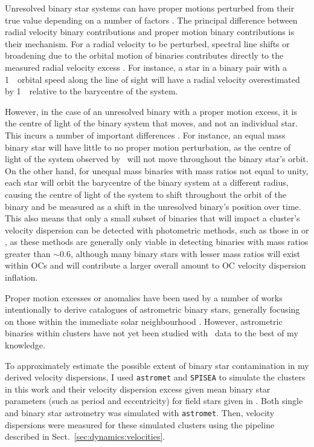 Unresolved binary star systems can have proper motions perturbed from their true value depending on a number of factors \citep{penoyre_binary_2020}. The principal difference between radial velocity binary contributions and proper motion binary contributions is their mechanism. For a radial velocity to be perturbed, spectral line shifts or broadening due to the orbital motion of binaries contributes directly to the measured radial velocity excess \citep{gieles_velocity_2010}. For instance, a star in a binary pair with a 1~\kms\ orbital speed along the line of sight will have a radial velocity overestimated by 1~\kms\ relative to the barycentre of the system.

However, in the case of an unresolved binary with a proper motion excess, it is the centre of light of the binary system that moves, and not an individual star. This incurs a number of important differences \citep{penoyre_binary_2020}. For instance, an equal mass binary star will have little to no proper motion perturbation, as the centre of light of the system observed by \gaia\ will not move throughout the binary star's orbit. On the other hand, for unequal mass binaries with mass ratios not equal to unity, each star will orbit the barycentre of the binary system at a different radius, causing the centre of light of the system to shift throughout the orbit of the binary and be measured as a shift in the unresolved binary's position over time. This also means that only a small subset of binaries that will impact a cluster's velocity dispersion can be detected with photometric methods, such as those in \cite{cordoni_photometric_binaries_2023} or \cite{donada_multiplicity_fraction_2023}, as these methods are generally only viable in detecting binaries with mass ratios greater than $\sim0.6$, although many binary stars with lesser mass ratios will exist within OCs and will contribute a larger overall amount to OC velocity dispersion inflation.

Proper motion excesses or anomalies have been used by a number of works intentionally to derive catalogues of astrometric binary stars, generally focusing on those within the immediate solar neighbourhood \citep{kervella_stellar_substellar_2019,penoyre_astrometric_2022-1}. However, astrometric binaries within clusters have not yet been studied with \gaia\ data to the best of my knowledge.

To approximately estimate the possible extent of binary star contamination in my derived velocity dispersions, I used \texttt{astromet} \citep{penoyre_astrometric_2022,penoyre_astrometric_2022-1} and \texttt{SPISEA} \citep{hosek_jr_pypopstar_2020} to simulate the clusters in this work and their velocity dispersion excess given mean binary star parameters (such as period and eccentricity) for field stars given in \cite{moe_mind_2017}. Both single and binary star astrometry was simulated with \texttt{astromet}. Then, velocity dispersions were measured for these simulated clusters using the pipeline described in Sect.~\ref{sec:dynamics:velocities}.

